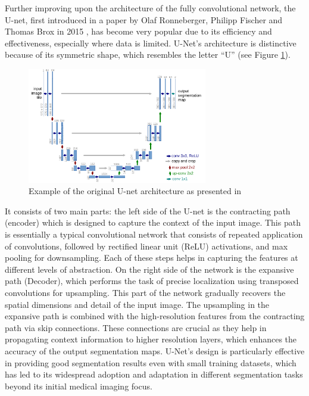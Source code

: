 \documentclass[a4paper,11pt]{article}
\begin{document}
Further improving upon the architecture of the fully convolutional network, the U-net, first introduced in a paper by Olaf Ronneberger, Philipp Fischer and Thomas Brox in 2015 \cite{DBLP:journals/corr/RonnebergerFB15}, has become very popular due to its efficiency and effectiveness, especially where data is limited. U-Net's architecture is distinctive because of its symmetric shape, which resembles the letter ``U'' (see Figure \ref{fig:u-netarch}). 
\begin{figure}
    \centering 
    \includegraphics[width=0.7\textwidth]{u-net-illustration-correct-scale2.pdf}
    \caption{Example of the original U-net architecture as presented in \cite{DBLP:journals/corr/RonnebergerFB15}}
    \label{fig:u-netarch}
\end{figure}
It consists of two main parts: the left side of the U-net is the contracting path (encoder) which is designed to capture the context of the input image. This path is essentially a typical convolutional network that consists of repeated application of convolutions, followed by rectified linear unit (ReLU) activations, and max pooling for downsampling. Each of these steps helps in capturing the features at different levels of abstraction. On the right side of the network is the expansive path (Decoder), which performs the task of precise localization using transposed convolutions for upsampling. This part of the network gradually recovers the spatial dimensions and detail of the input image. The upsampling in the expansive path is combined with the high-resolution features from the contracting path via skip connections. These connections are crucial as they help in propagating context information to higher resolution layers, which enhances the accuracy of the output segmentation maps. U-Net's design is particularly effective in providing good segmentation results even with small training datasets, which has led to its widespread adoption and adaptation in different segmentation tasks beyond its initial medical imaging focus.
\end{document}
